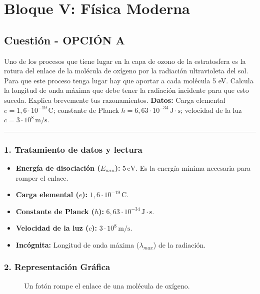 \newpage
\section{Bloque V: Física Moderna}
\label{sec:moderna_2012_sep}

\subsection{Cuestión - OPCIÓN A}
\label{subsec:VA_2012_sep}

\begin{cajaenunciado}
Uno de los procesos que tiene lugar en la capa de ozono de la estratosfera es la rotura del enlace de la molécula de oxígeno por la radiación ultravioleta del sol. Para que este proceso tenga lugar hay que aportar a cada molécula 5 eV. Calcula la longitud de onda máxima que debe tener la radiación incidente para que esto suceda. Explica brevemente tus razonamientos.
\textbf{Datos:} Carga elemental $e=1,6\cdot10^{-19}\,\text{C}$; constante de Planck $h=6,63\cdot10^{-34}\,\text{J}\cdot\text{s}$; velocidad de la luz $c=3\cdot10^8\,\text{m/s}$.
\end{cajaenunciado}
\hrule

\subsubsection*{1. Tratamiento de datos y lectura}
\begin{itemize}
    \item \textbf{Energía de disociación ($E_{min}$):} $5\,\text{eV}$. Es la energía mínima necesaria para romper el enlace.
    \item \textbf{Carga elemental ($e$):} $1,6 \cdot 10^{-19}\,\text{C}$.
    \item \textbf{Constante de Planck ($h$):} $6,63 \cdot 10^{-34}\,\text{J}\cdot\text{s}$.
    \item \textbf{Velocidad de la luz ($c$):} $3 \cdot 10^8\,\text{m/s}$.
    \item \textbf{Incógnita:} Longitud de onda máxima ($\lambda_{max}$) de la radiación.
\end{itemize}

\subsubsection*{2. Representación Gráfica}
\begin{figure}[H]
    \centering
    \caption{Un fotón rompe el enlace de una molécula de oxígeno.}
\end{figure}

